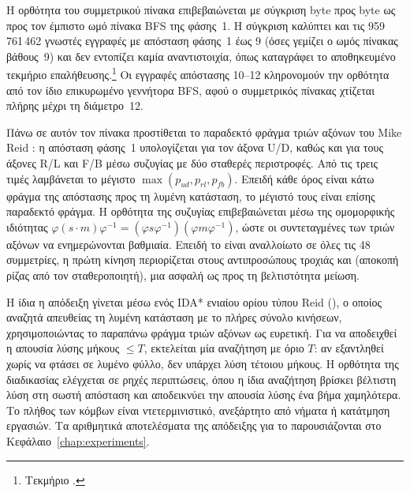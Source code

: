 Η ορθότητα του συμμετρικού πίνακα επιβεβαιώνεται με σύγκριση byte προς byte ως προς τον έμπιστο ωμό πίνακα BFS της φάσης~1. Η σύγκριση καλύπτει και τις 959\,761\,462 γνωστές εγγραφές με απόσταση φάσης~1 έως 9 (όσες γεμίζει ο ωμός πίνακας βάθους~9) και δεν εντοπίζει καμία αναντιστοιχία, όπως καταγράφει το αποθηκευμένο τεκμήριο επαλήθευσης.\footnote{Τεκμήριο .} Οι εγγραφές απόστασης 10--12 κληρονομούν την ορθότητα από τον ίδιο επικυρωμένο γεννήτορα BFS, αφού ο συμμετρικός πίνακας χτίζεται πλήρης μέχρι τη διάμετρο~12.

Πάνω σε αυτόν τον πίνακα προστίθεται το παραδεκτό φράγμα τριών αξόνων του Mike Reid \cite{reid1997optimal}: η απόσταση φάσης~1 υπολογίζεται για τον άξονα U/D, καθώς και για τους άξονες R/L και F/B μέσω συζυγίας με δύο σταθερές περιστροφές. Από τις τρεις τιμές λαμβάνεται το μέγιστο \(\max(p_{ud},p_{rl},p_{fb})\). Επειδή κάθε όρος είναι κάτω φράγμα της απόστασης προς τη λυμένη κατάσταση, το μέγιστό τους είναι επίσης παραδεκτό φράγμα. Η ορθότητα της συζυγίας επιβεβαιώνεται μέσω της ομομορφικής ιδιότητας \(\varphi(s\cdot m)\varphi^{-1} = (\varphi s\varphi^{-1})(\varphi m\varphi^{-1})\), ώστε οι συντεταγμένες των τριών αξόνων να ενημερώνονται βαθμιαία. Επειδή το  είναι αναλλοίωτο σε όλες τις 48 συμμετρίες, η πρώτη κίνηση περιορίζεται στους αντιπροσώπους τροχιάς  και  (αποκοπή ρίζας από τον σταθεροποιητή), μια ασφαλή ως προς τη βελτιστότητα μείωση.

Η ίδια η απόδειξη γίνεται μέσω ενός IDA* ενιαίου ορίου τύπου Reid (), ο οποίος αναζητά απευθείας τη λυμένη κατάσταση με το πλήρες σύνολο κινήσεων, χρησιμοποιώντας το παραπάνω φράγμα τριών αξόνων ως ευρετική. Για να αποδειχθεί η απουσία λύσης μήκους \(\le T\), εκτελείται μία αναζήτηση με όριο \(T\): αν εξαντληθεί χωρίς να φτάσει σε λυμένο φύλλο, δεν υπάρχει λύση τέτοιου μήκους. Η ορθότητα της διαδικασίας ελέγχεται σε ρηχές περιπτώσεις, όπου η ίδια αναζήτηση βρίσκει βέλτιστη λύση στη σωστή απόσταση και αποδεικνύει την απουσία λύσης ένα βήμα χαμηλότερα. Το πλήθος των κόμβων είναι ντετερμινιστικό, ανεξάρτητο από νήματα ή κατάτμηση εργασιών. Τα αριθμητικά αποτελέσματα της απόδειξης για το  παρουσιάζονται στο Κεφάλαιο~\ref{chap:experiments}.

